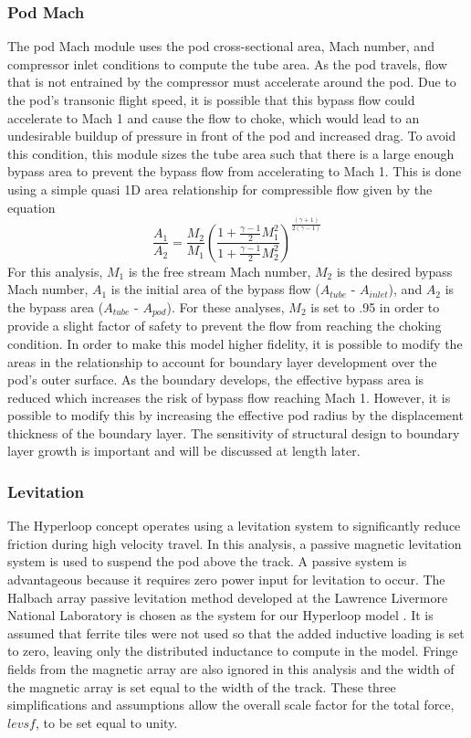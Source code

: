 \subsubsection{Pod Mach}
	The pod Mach module uses the pod cross-sectional area, Mach number, and
	compressor inlet conditions to compute the tube area. As the pod travels,
	flow that is not entrained by the compressor must accelerate around the pod.
	Due to the pod’s transonic flight speed, it is possible that this bypass
	flow could accelerate to Mach 1 and cause the flow to choke, which would
	lead to an undesirable buildup of pressure in front of the pod and
	increased drag. To avoid this condition, this module sizes the tube area
	such that there is a large enough bypass area to prevent the bypass flow
	from accelerating to Mach 1. This is done using a simple quasi 1D area
	relationship for compressible flow given by the equation
	\begin{equation}
		\label{eq:mach_to_area}
		\frac{A_{1}}{A_{2}}=\frac{M_{2}}{M_{1}} \left( \frac{1+\frac{\gamma -1}{2}M_{1}^{2}}{1+\frac{\gamma -1}{2}M_{2}^{2}} \right)^{\frac{( \gamma +1 )}{2 ( \gamma -1  )}}
	\end{equation}
	For this analysis, $M_1$ is the free stream Mach number, $M_2$ is the
	desired bypass Mach number, $A_1$ is the initial area of the bypass flow
	($A_{tube}$ - $A_{inlet}$), and $A_2$ is the bypass area ($A_{tube}$ - $A_{pod}$).
	For these analyses, $M_2$ is set to .95 in order to provide a slight factor
	of safety to prevent the flow from reaching the choking condition.
	In order to make this model higher fidelity, it is possible to modify the
	areas in the relationship to account for boundary layer development over
	the pod's outer surface. As the boundary develops, the effective bypass area
	is reduced which increases the risk of bypass flow reaching Mach 1. However,
	it is possible to modify this by increasing the effective pod radius by the
	displacement thickness of the boundary layer. The sensitivity of structural
	design to boundary layer growth is important and will be discussed at length later.
\subsubsection{Levitation}

	The Hyperloop concept operates using a levitation system to significantly
	reduce friction during high velocity travel. In this analysis, a
	passive magnetic levitation system is used to suspend the pod above the
	track. A passive system is advantageous because it requires
	zero power input for levitation to occur. The Halbach array passive levitation method
	developed at the Lawrence Livermore National Laboratory is chosen as the
	system for our Hyperloop model \cite{inductrack}. It is assumed that
	ferrite tiles were not used so that the added inductive loading is set to
	zero, leaving only the distributed inductance to compute in the model.
	Fringe fields from the magnetic array are also ignored in this analysis and
	the width of the magnetic array is set equal to the width of the track.
	These three simplifications and assumptions allow the overall scale factor
	for the total force, $levsf$, to be set equal to unity.

